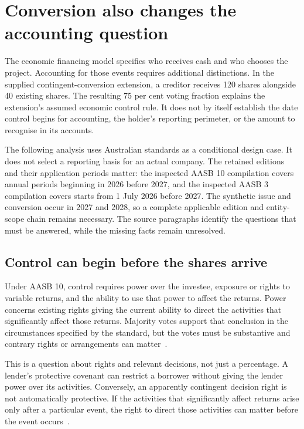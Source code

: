 \section{Conversion also changes the accounting question}
\label{sim:conversion-control-scope}

The economic financing model specifies who receives cash and who chooses the project. Accounting for those events requires additional distinctions. In the supplied contingent-conversion extension, a creditor receives 120 shares alongside 40 existing shares. The resulting 75 per cent voting fraction explains the extension's assumed economic control rule. It does not by itself establish the date control begins for accounting, the holder's reporting perimeter, or the amount to recognise in its accounts.

The following analysis uses Australian standards as a conditional design case. It does not select a reporting basis for an actual company. The retained editions and their application periods matter: the inspected AASB 10 compilation covers annual periods beginning in 2026 before 2027, and the inspected AASB 3 compilation covers starts from 1 July 2026 before 2027. The synthetic issue and conversion occur in 2027 and 2028, so a complete applicable edition and entity-scope chain remains necessary. The source paragraphs identify the questions that must be answered, while the missing facts remain unresolved.

\subsection{Control can begin before the shares arrive}

Under AASB 10, control requires power over the investee, exposure or rights to variable returns, and the ability to use that power to affect the returns. Power concerns existing rights giving the current ability to direct the activities that significantly affect those returns. Majority votes support that conclusion in the circumstances specified by the standard, but the votes must be substantive and contrary rights or arrangements can matter~\citep[paras.~6--18, B22--B28, B35--B37]{aasb10control2026}.

This is a question about rights and relevant decisions, not just a percentage. A lender's protective covenant can restrict a borrower without giving the lender power over its activities. Conversely, an apparently contingent decision right is not automatically protective. If the activities that significantly affect returns arise only after a particular event, the right to direct those activities can matter before the event occurs~\citep[paras.~B26--B28, B53]{aasb10control2026}.

